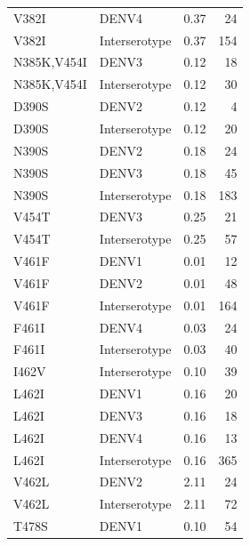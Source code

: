 \documentclass[11pt,oneside,letterpaper]{article}
\begin{document}
\begin{centering}
\begin{table}[ht]
{\begin{tabular}{llrr}
                           V382I &          DENV4 &  0.37 &     24 \\
                           V382I &  Interserotype &  0.37 &    154 \\
                     N385K,V454I &          DENV3 &  0.12 &     18 \\
                     N385K,V454I &  Interserotype &  0.12 &     30 \\
                           D390S &          DENV2 &  0.12 &      4 \\
                           D390S &  Interserotype &  0.12 &     20 \\
                           N390S &          DENV2 &  0.18 &     24 \\
                           N390S &          DENV3 &  0.18 &     45 \\
                           N390S &  Interserotype &  0.18 &    183 \\
                           V454T &          DENV3 &  0.25 &     21 \\
                           V454T &  Interserotype &  0.25 &     57 \\
                           V461F &          DENV1 &  0.01 &     12 \\
                           V461F &          DENV2 &  0.01 &     48 \\
                           V461F &  Interserotype &  0.01 &    164 \\
                           F461I &          DENV4 &  0.03 &     24 \\
                           F461I &  Interserotype &  0.03 &     40 \\
                           I462V &  Interserotype &  0.10 &     39 \\
                           L462I &          DENV1 &  0.16 &     20 \\
                           L462I &          DENV3 &  0.16 &     18 \\
                           L462I &          DENV4 &  0.16 &     13 \\
                           L462I &  Interserotype &  0.16 &    365 \\
                           V462L &          DENV2 &  2.11 &     24 \\
                           V462L &  Interserotype &  2.11 &     72 \\
                           T478S &          DENV1 &  0.10 &     54 \\

\end{tabular}}
\end{table}
\end{centering}
\end{document}
